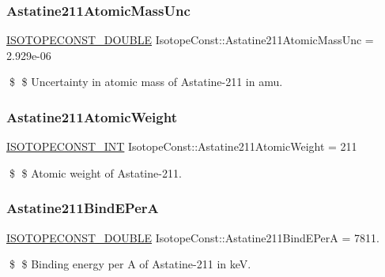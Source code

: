 \subsubsection{\texorpdfstring{Astatine211\+Atomic\+Mass\+Unc}{Astatine211AtomicMassUnc}}
{\footnotesize\ttfamily \mbox{\hyperlink{group___isotope_const-_macros_ga8f45a7272ce02c0b4c65c44636ed719a}{I\+S\+O\+T\+O\+P\+E\+C\+O\+N\+S\+T\+\_\+\+D\+O\+U\+B\+LE}} Isotope\+Const\+::\+Astatine211\+Atomic\+Mass\+Unc = 2.\+929e-\/06}

\$ \$ Uncertainty in atomic mass of Astatine-\/211 in amu. \mbox{\label{group___isotope_const-_astatine-_at211_gabafa8b19212f84d0f9031eb8c5b8176f}} 
\subsubsection{\texorpdfstring{Astatine211\+Atomic\+Weight}{Astatine211AtomicWeight}}
{\footnotesize\ttfamily \mbox{\hyperlink{group___isotope_const-_macros_ga5f18360b3e99483a35c32d789e62621c}{I\+S\+O\+T\+O\+P\+E\+C\+O\+N\+S\+T\+\_\+\+I\+NT}} Isotope\+Const\+::\+Astatine211\+Atomic\+Weight = 211}

\$ \$ Atomic weight of Astatine-\/211. \mbox{\label{group___isotope_const-_astatine-_at211_ga692409f3b64fbd737601b989ed50fa75}} 
\subsubsection{\texorpdfstring{Astatine211\+Bind\+E\+PerA}{Astatine211BindEPerA}}
{\footnotesize\ttfamily \mbox{\hyperlink{group___isotope_const-_macros_ga8f45a7272ce02c0b4c65c44636ed719a}{I\+S\+O\+T\+O\+P\+E\+C\+O\+N\+S\+T\+\_\+\+D\+O\+U\+B\+LE}} Isotope\+Const\+::\+Astatine211\+Bind\+E\+PerA = 7811.}

\$ \$ Binding energy per A of Astatine-\/211 in keV. \mbox{\label{group___isotope_const-_astatine-_at211_ga0f9fe344c07c1226fe2818bd75666746}} 
